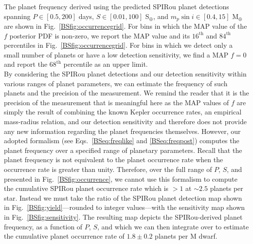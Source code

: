 The planet frequency derived using the predicted SPIRou planet detections spanning
$P \in [0.5,200]$ days, $S \in [0.01,100]$ S$_{\oplus}$, and $m_p\sin{i} \in [0.4,15]$ M$_{\oplus}$
are shown in Fig.~\ref{BSfig:occurrencegrid}. For bins in which the MAP value of the $f$ posterior PDF
is non-zero, we report the MAP value and its $16^{\text{th}}$ and $84^{\text{th}}$ percentiles in
Fig.~\ref{BSfig:occurrencegrid}. For bins
in which we detect only a small number of planets or have a low detection sensitivity, we find a MAP
$f=0$ and report the $68^{\text{th}}$ percentile as an upper limit. \\

By considering the SPIRou planet detections and our detection sensitivity within various ranges of planet
parameters, we can estimate the frequency of such planets and the precision of the measurement. We remind
the reader that it is the precision of the measurement that is meaningful here as the MAP values of $f$
are simply the result of combining the known Kepler occurrence rates, an empirical mass-radius relation,
and our detection sensitivity and therefore does not provide any new information regarding the planet
frequencies themselves. However, our adopted formalism (see Eqs.~\ref{BSeq:freqlike} and \ref{BSeq:freqpost})
computes the planet frequency over a specified range of planetary parameters.
Recall that the planet frequency is not equivalent to the planet occurrence rate when the occurrence
rate is greater than unity. Therefore, over the full range of $P$, $S$, and \msini{} presented in
Fig.~\ref{BSfig:occurrence}, we cannot use this formalism to compute the cumulative SPIRou planet occurrence
rate which is $>1$ at $\sim 2.5$ planets per star. Instead we must take the ratio of the 
SPIRou planet detection map shown in Fig.~\ref{BSfig:yield}---rounded to integer values---with the
sensitivity map shown in Fig.~\ref{BSfig:sensitivity}.
The resulting map depicts the SPIRou-derived planet frequency,
as a function of $P$, $S$, and \msini{,} which we can then integrate over to estimate the cumulative
planet occurrence rate of $1.8 \pm 0.2$ planets per M dwarf.


